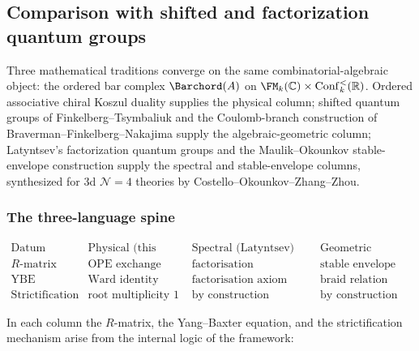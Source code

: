 \subsection{Comparison with shifted and factorization quantum groups}
\label{subsec:shifted-factorization-comparison}

Three mathematical traditions converge on the same combinatorial-algebraic
object: the ordered bar complex $\Barchord(A)$ on
$\FM_k(\mathbb{C})\times\mathrm{Conf}_k^<(\mathbb{R})$. Ordered
associative chiral Koszul duality supplies the physical column;
shifted quantum groups of Finkelberg--Tsymbaliuk and the
Coulomb-branch construction of Braverman--Finkelberg--Nakajima supply
the algebraic-geometric column; Latyntsev's factorization quantum
groups and the Maulik--Okounkov stable-envelope construction supply
the spectral and stable-envelope columns, synthesized for
3d $\mathcal{N}=4$ theories by Costello--Okounkov--Zhang--Zhou.

\subsubsection*{The three-language spine}

\[
\begin{array}{c|c|c|c}
\text{Datum} & \text{Physical (this work)} & \text{Spectral (Latyntsev)}
 & \text{Geometric (COZZ)} \\
\hline
R\text{-matrix} & \text{OPE exchange} & \text{factorisation isomorphism} &
 \text{stable envelope} \\
\text{YBE} & \text{Ward identity} & \text{factorisation axiom} &
 \text{braid relation} \\
\text{Strictification} & \text{root multiplicity 1} &
 \text{by construction} & \text{by construction}
\end{array}
\]

In each column the $R$-matrix, the Yang--Baxter equation, and the
strictification mechanism arise from the internal logic of the
framework:

